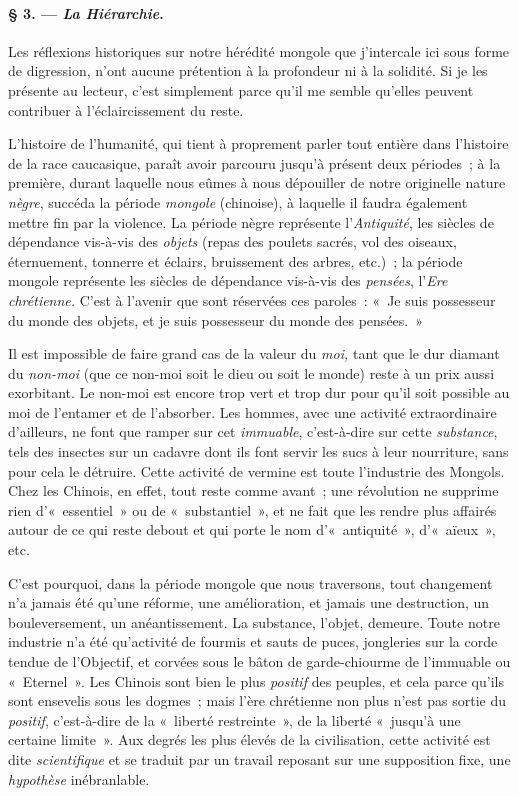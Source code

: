 \documentclass[french,twoside]{book} %
\begin{document}
\paragraph[{§ 3. — La Hiérarchie.}]{§ 3. — \emph{La Hiérarchie}.}
\noindent Les réflexions historiques sur notre hérédité mongole que j’intercale ici sous forme de digression, n’ont aucune prétention à la profondeur ni à la solidité. Si je les présente au lecteur, c’est simplement parce qu’il me semble qu’elles peuvent contribuer à l’éclaircissement du reste.\par
L’histoire de l’humanité, qui tient à proprement parler tout entière dans l’histoire de la race caucasique, paraît avoir parcouru jusqu’à présent deux périodes ; à la première, durant laquelle nous eûmes à nous dépouiller de notre originelle nature \emph{nègre}, succéda la période \emph{mongole} (chinoise), à laquelle il faudra également mettre fin par la violence. La période nègre représente l’\emph{Antiquité}, les siècles de dépendance vis-à-vis des \emph{objets} (repas des poulets sacrés, vol des oiseaux, éternuement, tonnerre et éclairs, bruissement des arbres, etc.) ; la période mongole représente les siècles de dépendance vis-à-vis des \emph{pensées}, l’\emph{Ere chrétienne.} C’est à l’avenir que sont réservées ces paroles : « Je suis possesseur du monde des objets, et je suis possesseur du monde des pensées. »\par
 Il est impossible de faire grand cas de la valeur du \emph{moi,} tant que le dur diamant du \emph{non-moi} (que ce non-moi soit le dieu ou soit le monde) reste à un prix aussi exorbitant. Le non-moi est encore trop vert et trop dur pour qu’il soit possible au moi de l’entamer et de l’absorber. Les hommes, avec une activité extraordinaire d’ailleurs, ne font que ramper sur cet \emph{immuable}, c’est-à-dire sur cette \emph{substance}, tels des insectes sur un cadavre dont ils font servir les sucs à leur nourriture, sans pour cela le détruire. Cette activité de vermine est toute l’industrie des Mongols. Chez les Chinois, en effet, tout reste comme avant ; une révolution ne supprime rien d’« essentiel » ou de « substantiel », et ne fait que les rendre plus affairés autour de ce qui reste debout et qui porte le nom d’« antiquité », d’« aïeux », etc.\par
C’est pourquoi, dans la période mongole que nous traversons, tout changement n’a jamais été qu’une réforme, une amélioration, et jamais une destruction, un bouleversement, un anéantissement. La substance, l’objet, demeure. Toute notre industrie n’a été qu’activité de fourmis et sauts de puces, jongleries sur la corde tendue de l’Objectif, et corvées sous le bâton de garde-chiourme de l’immuable ou « Eternel ». Les Chinois sont bien le plus \emph{positif} des peuples, et cela parce qu’ils sont ensevelis sous les dogmes ; mais l’ère chrétienne non plus n’est pas sortie du \emph{positif}, c’est-à-dire de la « liberté restreinte », de la liberté « jusqu’à une certaine limite ». Aux degrés les plus élevés de la civilisation, cette activité est dite \emph{scientifique} et se traduit par un travail reposant sur une supposition fixe, une \emph{hypothèse} inébranlable.\par
\end{document}
